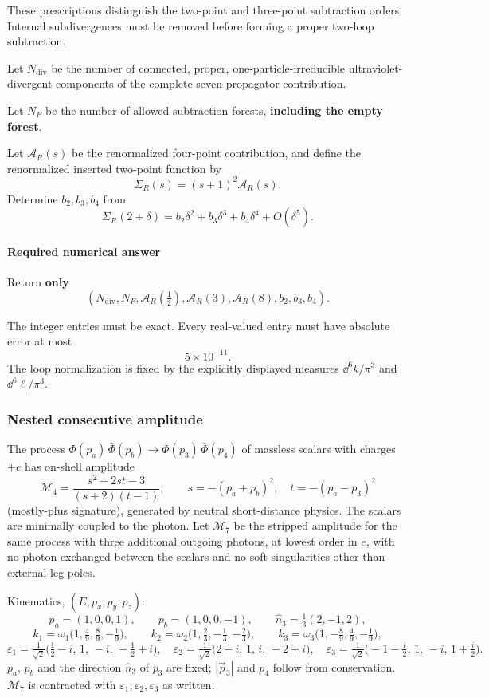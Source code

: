 These prescriptions distinguish the two-point and three-point
subtraction orders. Internal subdivergences must be removed before
forming a proper two-loop subtraction.

Let $N_{\mathrm{div}}$ be the number of connected, proper,
one-particle-irreducible ultraviolet-divergent components of the
complete seven-propagator contribution.

Let $N_F$ be the number of allowed subtraction forests,
\textbf{including the empty forest}.

Let $\mathcal{A}_R(s)$ be the renormalized four-point contribution,
and define the renormalized inserted two-point function by
\[
    \Sigma_R(s)=(s+1)^2\mathcal{A}_R(s).
\]
Determine $b_2,b_3,b_4$ from
\[
    \Sigma_R(2+\delta)
    =b_2\delta^2+b_3\delta^3+b_4\delta^4+O(\delta^5).
\]

\paragraph*{Required numerical answer}

Return \textbf{only}
\[
\boxed{
    \left(
        N_{\mathrm{div}},N_F,
        \mathcal{A}_R\!\left(\tfrac12\right),
        \mathcal{A}_R(3),\mathcal{A}_R(8),
        b_2,b_3,b_4
    \right).
}
\]

The integer entries must be exact. Every real-valued entry must have
absolute error at most
\[
    \boxed{5\times10^{-11}}.
\]
The loop normalization is fixed by the explicitly displayed measures
$\dd^6 k/\pi^3$ and $\dd^6\ell/\pi^3$.


\subsubsection{Nested consecutive amplitude}
\label{problem:nested-consecutive-triple-soft}
The process $\Phi(p_a)\,\bar\Phi(p_b)\to\Phi(p_3)\,\bar\Phi(p_4)$ of massless scalars with charges $\pm e$ has on-shell amplitude
\[
\mathcal M_4=\frac{s^2+2st-3}{(s+2)(t-1)},\qquad s=-(p_a+p_b)^2,\quad t=-(p_a-p_3)^2
\]
(mostly-plus signature), generated by neutral short-distance physics. The scalars are minimally coupled to the photon. Let $\mathcal M_7$ be the stripped amplitude for the same process with three additional outgoing photons, at lowest order in $e$, with no photon exchanged between the scalars and no soft singularities other than external-leg poles.

Kinematics, $(E,p_x,p_y,p_z)$:
\[
p_a=(1,0,0,1),\qquad p_b=(1,0,0,-1),\qquad \hat n_3=\tfrac13(2,-1,2),
\]
\[
k_1=\omega_1\big(1,\tfrac49,\tfrac89,-\tfrac19\big),\qquad
k_2=\omega_2\big(1,\tfrac23,-\tfrac13,-\tfrac23\big),\qquad
k_3=\omega_3\big(1,-\tfrac89,\tfrac49,-\tfrac19\big),
\]
\[
\varepsilon_1=\tfrac1{\sqrt2}\big(\tfrac12-i,\,1,\,-i,\,-\tfrac12+i\big),\quad
\varepsilon_2=\tfrac1{\sqrt2}\big(2-i,\,1,\,i,\,-2+i\big),\quad
\varepsilon_3=\tfrac1{\sqrt2}\big(-1-\tfrac i2,\,1,\,-i,\,1+\tfrac i2\big).
\]
$p_a$, $p_b$ and the direction $\hat n_3$ of $p_3$ are fixed; $|\vec p_3|$ and $p_4$ follow from conservation. $\mathcal M_7$ is contracted with $\varepsilon_1,\varepsilon_2,\varepsilon_3$ as written.

